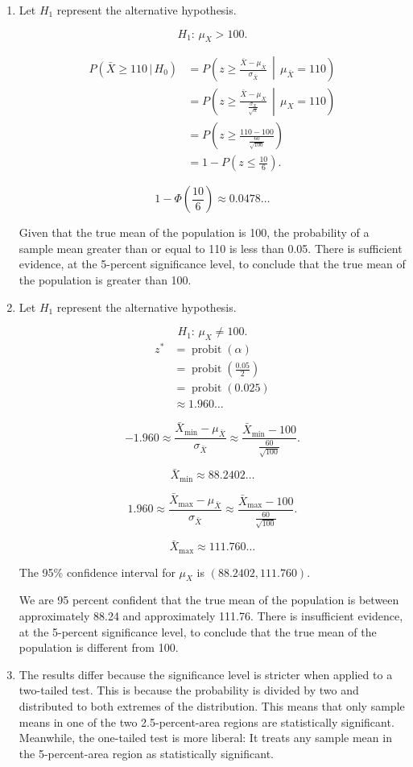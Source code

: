 \documentclass[12pt]{article}
\DeclareMathOperator{\probit}{probit}
\begin{document}
\begin{enumerate}
\item Let $H_1$ represent the alternative hypothesis.

\[H_1:\,\mu_X>100.\]

\begin{align*}
P(\bar{X}\geq 110\,|\,H_0)
&=P\left(z\geq\frac{\bar{X}-\mu_{\bar{X}}}{\sigma_{\bar{X}}}\,\middle|\,\mu_{\bar{X}}=110\right)\\
&=P\left(z\geq\frac{\bar{X}-\mu_X}{\frac{\sigma_X}{\sqrt{n}}}\,\middle|\,\mu_X=110\right)\\
&=P\left(z\geq\frac{110-100}{\frac{60}{\sqrt{100}}}\right)\\
&=1-P\left(z\leq\frac{10}{6}\right).
\end{align*}

\[1-\Phi\left(\frac{10}{6}\right)\approx 0.0478\dots\]

Given that the true mean of the population is 100, the probability of a sample mean greater than or equal to 110 is less than 0.05. There is sufficient evidence, at the 5-percent significance level, to conclude that the true mean of the population is greater than 100.

\item Let $H_1$ represent the alternative hypothesis.

\[H_1:\,\mu_X\neq 100.\]
\begin{align*}
z^*
&=\probit(\alpha)\\
&=\probit\left(\frac{0.05}{2}\right)\\
&=\probit(0.025)\\
&\approx 1.960\dots
\end{align*}

\[-1.960\approx\frac{\bar{X}_{\text{min}}-\mu_{\bar{X}}}{\sigma_{\bar{X}}}\approx\frac{\bar{X}_{\text{min}}-100}{\frac{60}{\sqrt{100}}}.\]

\[\bar{X}_{\text{min}}\approx 88.2402\dots\]

\[1.960\approx\frac{\bar{X}_{\text{max}}-\mu_{\bar{X}}}{\sigma_{\bar{X}}}\approx\frac{\bar{X}_{\text{max}}-100}{\frac{60}{\sqrt{100}}}.\]

\[\bar{X}_{\text{max}}\approx 111.760\dots\]

The 95\% confidence interval for $\mu_X$ is $(88.2402, 111.760)$.

We are 95 percent confident that the true mean of the population is between approximately 88.24 and approximately 111.76. There is insufficient evidence, at the 5-percent significance level, to conclude that the true mean of the population is different from 100.
\item The results differ because the significance level is stricter when applied to a two-tailed test. This is because the probability is divided by two and distributed to both extremes of the distribution. This means that only sample means in one of the two 2.5-percent-area regions are statistically significant. Meanwhile, the one-tailed test is more liberal: It treats any sample mean in the 5-percent-area region as statistically significant.
\end{enumerate}
\end{document}
